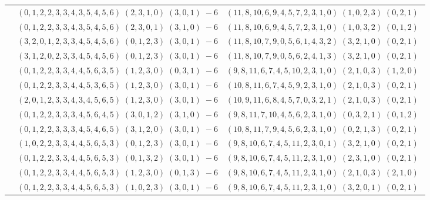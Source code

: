 \documentclass[11pt]{article}
\begin{document}
\begin{longtable}[l]{|c|c|c|}
 \cline{2-3} 
 & $(0 ,1 ,2 ,2 ,3 ,3 ,4 ,3 ,5 ,4 ,5 ,6) \;(2 ,3 ,1 ,0) \;(3 ,0 ,1) \;-6$ & $(11 ,8 ,10 ,6 ,9 ,4 ,5 ,7 ,2 ,3 ,1 ,0) \;(1 ,0 ,2 ,3) \;(0 ,2 ,1) \;$\\ 
 \cline{2-3} 
 & $(0 ,1 ,2 ,2 ,3 ,3 ,4 ,3 ,5 ,4 ,5 ,6) \;(2 ,3 ,0 ,1) \;(3 ,1 ,0) \;-6$ & $(11 ,8 ,10 ,6 ,9 ,4 ,5 ,7 ,2 ,3 ,1 ,0) \;(1 ,0 ,3 ,2) \;(0 ,1 ,2) \;$\\ 
 \cline{2-3} 
 & $(3 ,2 ,0 ,1 ,2 ,3 ,3 ,4 ,5 ,4 ,5 ,6) \;(0 ,1 ,2 ,3) \;(3 ,0 ,1) \;-6$ & $(11 ,8 ,10 ,7 ,9 ,0 ,5 ,6 ,1 ,4 ,3 ,2) \;(3 ,2 ,1 ,0) \;(0 ,2 ,1) \;$\\ 
 \cline{2-3} 
 & $(3 ,1 ,2 ,0 ,2 ,3 ,3 ,4 ,5 ,4 ,5 ,6) \;(0 ,1 ,2 ,3) \;(3 ,0 ,1) \;-6$ & $(11 ,8 ,10 ,7 ,9 ,0 ,5 ,6 ,2 ,4 ,1 ,3) \;(3 ,2 ,1 ,0) \;(0 ,2 ,1) \;$\\ 
 \cline{2-3} 
 & $(0 ,1 ,2 ,2 ,3 ,3 ,4 ,4 ,5 ,6 ,3 ,5) \;(1 ,2 ,3 ,0) \;(0 ,3 ,1) \;-6$ & $(9 ,8 ,11 ,6 ,7 ,4 ,5 ,10 ,2 ,3 ,1 ,0) \;(2 ,1 ,0 ,3) \;(1 ,2 ,0) \;$\\ 
 \cline{2-3} 
 & $(0 ,1 ,2 ,2 ,3 ,3 ,4 ,4 ,5 ,3 ,6 ,5) \;(1 ,2 ,3 ,0) \;(3 ,0 ,1) \;-6$ & $(10 ,8 ,11 ,6 ,7 ,4 ,5 ,9 ,2 ,3 ,1 ,0) \;(2 ,1 ,0 ,3) \;(0 ,2 ,1) \;$\\ 
 \cline{2-3} 
 & $(2 ,0 ,1 ,2 ,3 ,3 ,4 ,3 ,4 ,5 ,6 ,5) \;(1 ,2 ,3 ,0) \;(3 ,0 ,1) \;-6$ & $(10 ,9 ,11 ,6 ,8 ,4 ,5 ,7 ,0 ,3 ,2 ,1) \;(2 ,1 ,0 ,3) \;(0 ,2 ,1) \;$\\ 
 \cline{2-3} 
 & $(0 ,1 ,2 ,2 ,3 ,3 ,3 ,4 ,5 ,6 ,4 ,5) \;(3 ,0 ,1 ,2) \;(3 ,1 ,0) \;-6$ & $(9 ,8 ,11 ,7 ,10 ,4 ,5 ,6 ,2 ,3 ,1 ,0) \;(0 ,3 ,2 ,1) \;(0 ,1 ,2) \;$\\ 
 \cline{2-3} 
 & $(0 ,1 ,2 ,2 ,3 ,3 ,3 ,4 ,5 ,4 ,6 ,5) \;(3 ,1 ,2 ,0) \;(3 ,0 ,1) \;-6$ & $(10 ,8 ,11 ,7 ,9 ,4 ,5 ,6 ,2 ,3 ,1 ,0) \;(0 ,2 ,1 ,3) \;(0 ,2 ,1) \;$\\ 
 \cline{2-3} 
 & $(1 ,0 ,2 ,2 ,3 ,3 ,4 ,4 ,5 ,6 ,5 ,3) \;(0 ,1 ,2 ,3) \;(3 ,0 ,1) \;-6$ & $(9 ,8 ,10 ,6 ,7 ,4 ,5 ,11 ,2 ,3 ,0 ,1) \;(3 ,2 ,1 ,0) \;(0 ,2 ,1) \;$\\ 
 \cline{2-3} 
 & $(0 ,1 ,2 ,2 ,3 ,3 ,4 ,4 ,5 ,6 ,5 ,3) \;(0 ,1 ,3 ,2) \;(3 ,0 ,1) \;-6$ & $(9 ,8 ,10 ,6 ,7 ,4 ,5 ,11 ,2 ,3 ,1 ,0) \;(2 ,3 ,1 ,0) \;(0 ,2 ,1) \;$\\ 
 \cline{2-3} 
 & $(0 ,1 ,2 ,2 ,3 ,3 ,4 ,4 ,5 ,6 ,5 ,3) \;(1 ,2 ,3 ,0) \;(0 ,1 ,3) \;-6$ & $(9 ,8 ,10 ,6 ,7 ,4 ,5 ,11 ,2 ,3 ,1 ,0) \;(2 ,1 ,0 ,3) \;(2 ,1 ,0) \;$\\ 
 \cline{2-3} 
 & $(0 ,1 ,2 ,2 ,3 ,3 ,4 ,4 ,5 ,6 ,5 ,3) \;(1 ,0 ,2 ,3) \;(3 ,0 ,1) \;-6$ & $(9 ,8 ,10 ,6 ,7 ,4 ,5 ,11 ,2 ,3 ,1 ,0) \;(3 ,2 ,0 ,1) \;(0 ,2 ,1) \;$\\ 

\end{longtable}
\end{document}
